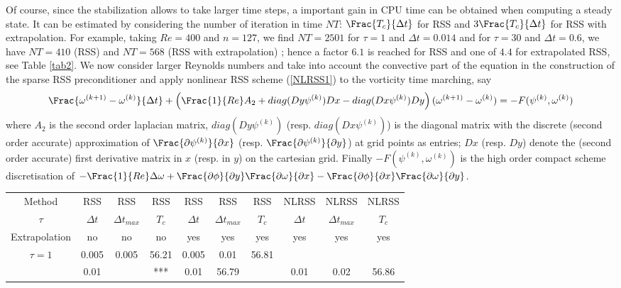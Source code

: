 {Of course, since the stabilization allows to take larger time steps, a important gain in CPU time can be obtained when computing a steady state. It can be estimated by considering the number of iteration in time $NT$: $\Frac{T_c}{\Delta t}$ for RSS and  $3\Frac{T_c}{\Delta t}$ for RSS with extrapolation.
For example, taking $Re=400$ and $n=127$, we find $NT=2501$ for $\tau=1$ and $\Delta t=0.014$ and  for $\tau=30$ and $\Delta t=0.6$, we have $NT=410$ (RSS) and $NT=568$ (RSS with extrapolation) ; hence a factor $6.1$ is reached for RSS and one of $4.4$ for extrapolated RSS, see Table \ref{tab2}.
\newpage
We now consider larger Reynolds numbers and take into account the convective part of the equation in the construction of the sparse RSS preconditioner and apply nonlinear RSS scheme (\ref{NLRSS1}) to the vorticity time marching, say
\begin{eqnarray}
\Frac{\omega^{(k+1)}-\omega^{(k)}}{\Delta t} 
+\left(\Frac{1}{Re}A_2+diag(Dy\psi^{(k)}) Dx -diag(Dx\psi^{(k)})Dy\right)(\omega^{(k+1)}-\omega^{(k)})=-F(\psi^{(k)},\omega^{(k)})
\end{eqnarray}
where $A_2$ is the second order laplacian matrix, $diag(Dy\psi^{(k)})$ (resp. $diag(Dx\psi^{(k)})$) is the
diagonal matrix with the discrete (second order accurate) approximation of $\Frac{\partial \psi^{(k)}}{\partial x}$
(resp.  $\Frac{\partial \psi^{(k)}}{\partial y}$) at grid points as entries; $Dx$ (resp. $Dy$) denote the (second order accurate) first derivative matrix in $x$ (resp. in $y$) on the cartesian grid. Finally $-F(\psi^{(k)},\omega^{(k)})$ is the high order compact scheme discretisation of $-\Frac {1}{Re}\Delta \omega
 +\Frac {\partial \phi}{\partial y}
\Frac {\partial \omega}{\partial x} - \Frac {\partial \phi}{\partial
x}
\Frac {\partial \omega}{\partial y}$.
\begin{table}[ht!]
\begin{center}
\begin{tabular}{|c||c|c|c||c|c|c||c|c|c|}
\hline
Method & RSS & RSS & RSS & RSS & RSS & RSS & NLRSS & NLRSS & NLRSS\\
$\tau$ & $\Delta t$ & $\Delta t_{max}$ & $T_c$ & $\Delta t$ & $\Delta t_{max}$ & $T_c$&$\Delta t$ & $\Delta t_{max}$ & $T_c$\\
Extrapolation & no  & no  & no  & yes& yes& yes &yes& yes& yes\\
\hline 
\hline 
$\tau = 1$ & 0.005 & 0.005 & 56.21& 0.005 & 0.01 & 56.81 & & &  \\ 
\hline
                  &  0.01       &        &   ***  &     0.01      &  56.79       &   & 0.01 & 0.02 & 56.86 \\ 

\end{tabular}
\end{center}
\end{table}}
